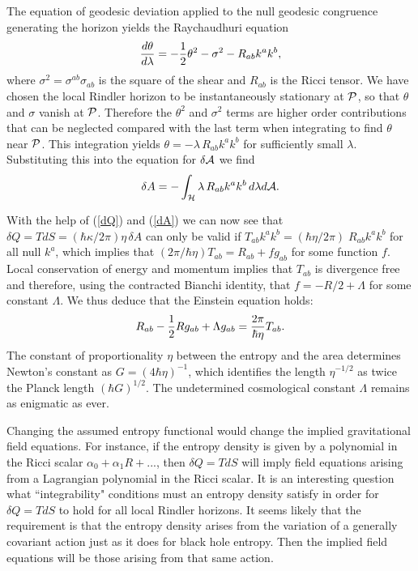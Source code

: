 \documentclass[12pt]{article}
\begin{document}
The equation of geodesic deviation applied to the null geodesic
congruence generating the horizon yields the Raychaudhuri equation
\begin{equation}
{d\theta\over d\lambda}=-{1\over2}\theta^2-\sigma^2-R_{ab}k^ak^b,
\end{equation}
where $\sigma^2=\sigma^{ab}\sigma_{ab}$ is the square of the
shear and $R_{ab}$ is the Ricci tensor.
We have chosen the local Rindler horizon to be instantaneously
stationary at ${\cal P}$,
so that $\theta$ and $\sigma$ vanish at ${\cal P}$. Therefore
the $\theta^2$ and $\sigma^2$ terms are higher order contributions
that can be neglected compared with the last term when integrating to
find $\theta$ near ${\cal P}$. This integration yields
$\theta=-\lambda\, R_{ab} k^a k^b $ for sufficiently
small $\lambda$. Substituting this into the equation
for $\delta {\cal A}$ we find
\begin{equation}
\delta A=-\int_{\cal H} \lambda \, R_{ab}k^a k^b \, d\lambda d{\cal A} .
\label{dA}
\end{equation}

With the help of (\ref{dQ})  and (\ref{dA}) we can now see that
$\delta Q=TdS=(\hbar\kappa/2\pi)\eta\, \delta A $ can only be valid if
$T_{ab}k^ak^b=(\hbar\eta/2\pi)\; R_{ab} k^ak^b$
for all null $k^a$, which implies that
$(2\pi/\hbar\eta)T_{ab}= R_{ab} + f g_{ab}$
for some function $f$.
Local conservation of energy and momentum implies that
$T_{ab}$ is divergence free and therefore, using the contracted
Bianchi identity, that
 $f=-R/2 +\Lambda$ for some
constant $\Lambda$. We thus deduce that the Einstein equation
holds:
\begin{equation}R_{ab}-{1\over 2}R g_{ab}+\Lambda g_{ab}=
{2\pi\over\hbar\eta}T_{ab}.
\end{equation}
The constant of proportionality $\eta$
between the entropy and the area
determines Newton's constant as $G=(4\hbar\eta)^{-1}$,
which identifies the length $\eta^{-1/2}$ as twice
the Planck length $(\hbar G)^{1/2}$. The undetermined
cosmological constant
$\Lambda$ remains as enigmatic as ever.

Changing the assumed entropy functional would change the implied
gravitational field equations. For instance, if the entropy density
is given by a polynomial in the Ricci scalar
$\alpha_0+\alpha_1 R+...$, then $\delta Q=TdS$ will imply
field equations arising from a Lagrangian polynomial in the
Ricci scalar\cite{poly}. It is an interesting question
what ``integrability" conditions must an entropy density satisfy
in order for $\delta Q=TdS$ to hold for all local Rindler horizons.
It seems likely that the requirement is that the entropy density
arises from the variation of a generally covariant action just as it
does for black hole entropy. Then the implied field equations will
be those arising from that same action.
\end{document}
